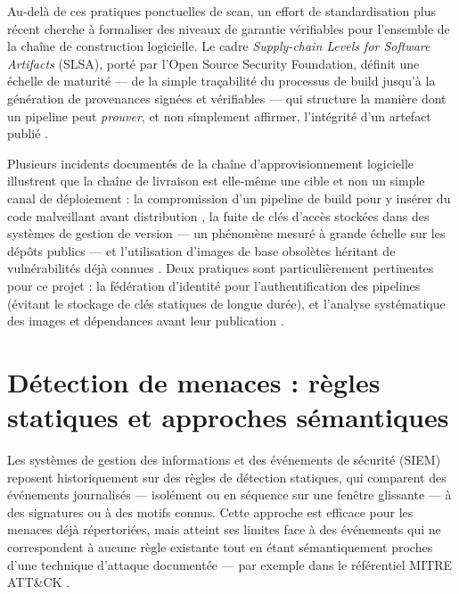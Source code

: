 Au-delà de ces pratiques ponctuelles de scan, un effort de standardisation plus récent cherche
à formaliser des niveaux de garantie vérifiables pour l'ensemble de la chaîne de construction
logicielle. Le cadre \emph{Supply-chain Levels for Software Artifacts} (SLSA), porté par
l'Open Source Security Foundation, définit une échelle de maturité --- de la simple traçabilité
du processus de build jusqu'à la génération de provenances signées et vérifiables --- qui
structure la manière dont un pipeline peut \emph{prouver}, et non simplement affirmer,
l'intégrité d'un artefact publié \parencite{slsa_framework}.

Plusieurs incidents documentés de la chaîne d'approvisionnement logicielle illustrent que la
chaîne de livraison est elle-même une cible et non un simple canal de déploiement : la
compromission d'un pipeline de build pour y insérer du code malveillant avant distribution
\parencite{cisa_aa20_352a}, la fuite de clés d'accès stockées dans des systèmes de gestion de
version --- un phénomène mesuré à grande échelle sur les dépôts publics
\parencite{gitguardian_sprawl} --- et l'utilisation d'images de base obsolètes héritant de
vulnérabilités déjà connues \parencite{gcp_container_best_practices}. Deux pratiques sont
particulièrement pertinentes pour ce projet : la fédération d'identité pour l'authentification
des pipelines (évitant le stockage de clés statiques de longue durée), et l'analyse
systématique des images et dépendances avant leur publication \parencite{owasp_cicd_top10}.

\section{Détection de menaces : règles statiques et approches sémantiques}

Les systèmes de gestion des informations et des événements de sécurité (SIEM) reposent
historiquement sur des règles de détection statiques, qui comparent des événements
journalisés --- isolément ou en séquence sur une fenêtre glissante --- à des signatures ou à
des motifs connus. Cette approche est efficace pour les menaces déjà répertoriées, mais
atteint ses limites face à des événements qui ne correspondent à aucune règle existante tout
en étant sémantiquement proches d'une technique d'attaque documentée --- par exemple dans le
référentiel MITRE ATT\&CK \parencite{mitre_attack,mitre_attack_design2018}.

